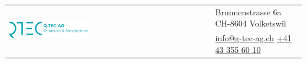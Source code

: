 
\thispagestyle{plain}
\begin{titlepage}
	


\begin{flushleft}
	 
		

	
	\begin{tabularx}{\textwidth}{p{8.5cm}X}
		\multirow{2}{*}{\includegraphics[width=0.4\textwidth]{Bilder/LogoQtecAG}} &\small{\textcolor{CorpColor}{Brunnenstrasse 6a}} \textcolor{CorpColor}{\textbullet} \small{\textcolor{CorpColor}{CH-8604 Volketswil}} \tabularnewline
		 
		 & \small{\href{mailto:info@q-tec-ag.ch}{\color{CorpColor}info@g-tec-ag.ch}} \textcolor{CorpColor}{\textbullet} \small{\href{tel:0041433556010}{\color{CorpColor}+41 43 355 60 10}} \tabularnewline
	\end{tabularx}
\vspace {4cm}

\def\LayoutTextField#1#2{%
	\def\Hy@temp{#1}%
	\ifx\Hy@temp\@empty
	#2%
	\else
	#1 \raisebox{\dimeval{-\height+\ht\strutbox}}{#2}%
	\fi
}
\makeatother


\vspace{1.5cm}


\LARGE{\textbf{\titel}}\\[1.5ex]
\Large{\textbf{\nummer}}\\[1.5ex]
\large{\fachgebiet}\\[1.5ex]
\vspace {2cm}

\normalsize{}
\\[1.5ex]


\end{flushleft}
\end{titlepage}

